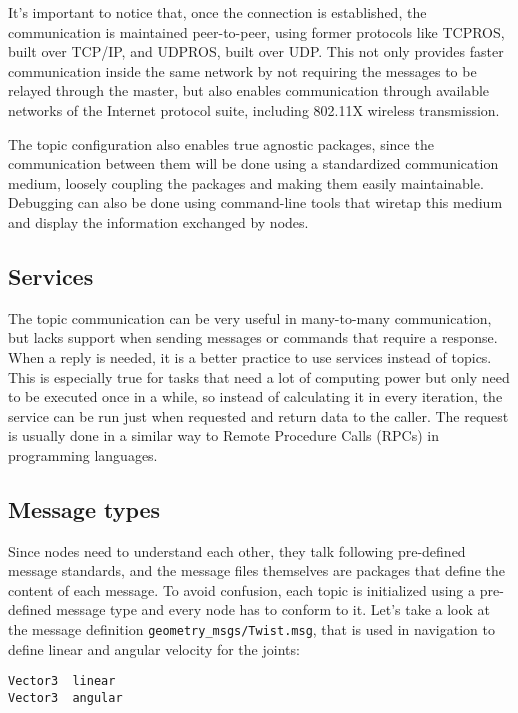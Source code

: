 It's important to notice that, once the connection is established, the communication is maintained peer-to-peer, using former protocols like TCPROS, built over TCP/IP, and UDPROS, built over UDP. This not only provides faster communication inside the same network by not requiring the messages to be relayed through the master, but also enables communication through available networks of the Internet protocol suite, including 802.11X wireless transmission.

The topic configuration also enables true agnostic packages, since the communication between them will be done using a standardized communication medium, loosely coupling the packages and making them easily maintainable. Debugging can also be done using command-line tools that wiretap this medium and display the information exchanged by nodes.

\subsection{Services}

The topic communication can be very useful in many-to-many communication, but lacks support when sending messages or commands that require a response. When a reply is needed, it is a better practice to use services instead of topics. This is especially true for tasks that need a lot of computing power but only need to be executed once in a while, so instead of calculating it in every iteration, the service can be run just when requested and return data to the caller. The request is usually done in a similar way to Remote Procedure Calls (RPCs) in programming languages.

\subsection{Message types}

Since nodes need to understand each other, they talk following pre-defined message standards, and the message files themselves are packages that define the content of each message. To avoid confusion, each topic is initialized using a pre-defined message type and every node has to conform to it. Let's take a look at the message definition \texttt{geometry\_msgs/Twist.msg}, that is used in navigation to define linear and angular velocity for the joints:

\begin{lstlisting}
Vector3  linear
Vector3  angular
\end{lstlisting}

